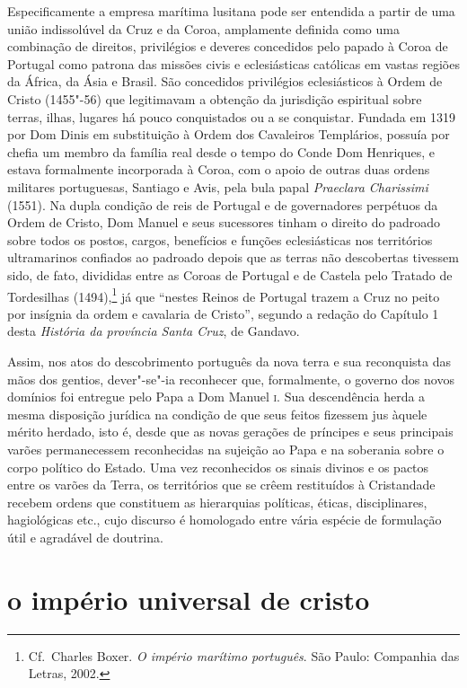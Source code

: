 Especificamente a empresa marítima lusitana pode ser entendida a partir
de uma união indissolúvel da Cruz e da Coroa, amplamente definida como
uma combinação de direitos, privilégios e deveres concedidos pelo
papado à Coroa de Portugal como patrona das missões civis e
eclesiásticas católicas em vastas regiões da África, da Ásia e Brasil.
São concedidos privilégios eclesiásticos à Ordem de Cristo (1455"-56)
que legitimavam a obtenção da jurisdição espiritual sobre terras,
ilhas, lugares há pouco conquistados ou a se conquistar. Fundada em
1319 por Dom Dinis em substituição à Ordem dos Cavaleiros Templários,
possuía por chefia um membro da família real desde o tempo do Conde Dom
Henriques, e estava formalmente incorporada à Coroa, com o apoio de
outras duas ordens militares portuguesas, Santiago e Avis, pela bula
papal \textit{Praeclara Charissimi} (1551). Na dupla condição de reis de
Portugal e de governadores perpétuos da Ordem de Cristo, Dom Manuel e
seus sucessores tinham o direito do padroado sobre todos os postos,
cargos, benefícios e funções eclesiásticas nos territórios ultramarinos
confiados ao padroado depois que as terras não descobertas tivessem
sido, de fato, divididas entre as Coroas de Portugal e de Castela pelo
Tratado de Tordesilhas (1494),\footnote{ Cf.~Charles Boxer. \textit{O império
marítimo português}. São Paulo: Companhia das Letras, 2002.} já que
``nestes Reinos de Portugal trazem a Cruz no peito por
insígnia da ordem e cavalaria de Cristo'', segundo a
redação do Capítulo 1 desta \textit{História da província Santa Cruz}, de Gandavo.

Assim, nos atos do descobrimento português da nova terra e sua
reconquista das mãos dos gentios, dever"-se"-ia reconhecer que,
formalmente, o governo dos novos domínios foi entregue pelo Papa a Dom
Manuel \textsc{i}. Sua descendência herda a mesma disposição jurídica na
condição de que seus feitos fizessem jus àquele mérito herdado, isto é,
desde que as novas gerações de príncipes e seus principais varões
permanecessem reconhecidas na sujeição ao Papa e na soberania sobre o
corpo político do Estado. Uma vez reconhecidos os sinais divinos e os
pactos entre os varões da Terra, os territórios que se crêem
restituídos à Cristandade recebem ordens que constituem as hierarquias
políticas, éticas, disciplinares, hagiológicas etc., cujo discurso é
homologado entre vária espécie de formulação útil e agradável de doutrina. 

\section{o império universal de cristo}

